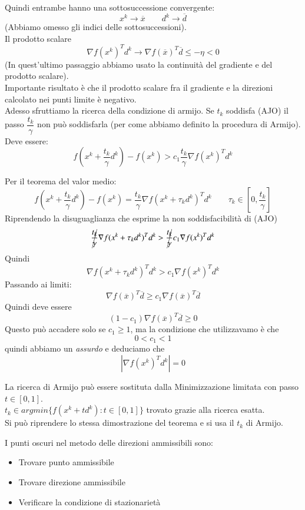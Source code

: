 \begin{thproof}
  Quindi entrambe hanno una sottosuccessione convergente:
  $$ x^{k} \rightarrow \overline{x} \qquad d^{k} \rightarrow \overline{d}$$
  (Abbiamo omesso gli indici delle sottosuccessioni). \\
  Il prodotto scalare
  $$\nabla f(x^{k})^{T}d^{k} \rightarrow \nabla f(\overline{x})^{T}\overline{d}
  \leq - \eta < 0$$
  (In quest'ultimo passaggio abbiamo usato la continuit\`a del gradiente
  e del prodotto scalare).\\
  Importante risultato \`e che il prodotto scalare fra il gradiente e la
  direzioni calcolato nei punti limite \`e negativo.\\
  Adesso sfruttiamo la ricerca della condizione di armijo. Se $t_k$
  soddisfa (AJO) il passo $ \dfrac{t_k}{\gamma}$ non pu\`o soddisfarla (per come abbiamo definito la procedura di Armijo).\\
  Deve essere:
  $$ f(x^{k}+ \dfrac{t_k}{\gamma} d^{k}) -
  f(x^{k}) > c_1 \dfrac{t_k}{\gamma} \nabla f(x^{k})^{T}d^{k}$$
  
  Per il teorema del valor medio:
  $$ f(x^{k}+ \dfrac{t_k}{\gamma} d^{k}) - f(x^{k}) = 
  \dfrac{t_k}{\gamma} \nabla f(x^{k} + \tau_k d^k)^{T} d^{k} \qquad 
  \tau_k \in[0,\dfrac{t_k}{\gamma}]$$
  Riprendendo la disuguaglianza che esprime la non soddisfacibilit\`a di (AJO)
  $$ \cancel{\dfrac{t_k}{\gamma}} \nabla f(x^{k} + \tau_k d^k)^{T} d^{k} > 
  \cancel{\dfrac{t_k}{\gamma}} c_1 \nabla f(x^{k})^{T}d^{k} $$
  Quindi
  $$ \nabla f(x^{k} + \tau_k d^{k})^{T} d^{k} > c_1 \nabla f(x^{k})^{T}d^{k}$$
  Passando ai limiti:
  $$ \nabla f(\overline{x})^{T}\overline{d} \geq
  c_1 \nabla f(\overline{x})^{T} \overline{d} $$
  Quindi deve essere
  $$(1 -c_1)\nabla f(\overline{x})^{T} \overline{d} \geq 0$$
  Questo pu\`o accadere solo se $c_1 \geq 1$, ma la condizione
  che utilizzavamo \`e che
  $$ 0 < c_1 < 1 $$
  quindi abbiamo un \emph{assurdo} e deduciamo che 
  $$ | \nabla f(x^k)^{T} d^{k} | = 0 $$
\end{thproof}

\begin{observation}
La ricerca di Armijo pu\`o essere sostituta dalla Minimizzazione
limitata con passo $t \in[0,1]$. \\ $t_k \in argmin \{ f(x^{k} +
td^{k}): t \in [0,1]\}$ trovato grazie alla ricerca esatta.\\ Si pu\`o
riprendere lo stessa dimostrazione del teorema e si usa il $t_k$ di
Armijo.
\end{observation}

I punti oscuri nel metodo delle direzioni ammissibili sono:
\begin{itemize}
  \item Trovare punto ammissibile
  \item Trovare direzione ammissibile
  \item Verificare la condizione di stazionariet\`a
\end{itemize}



